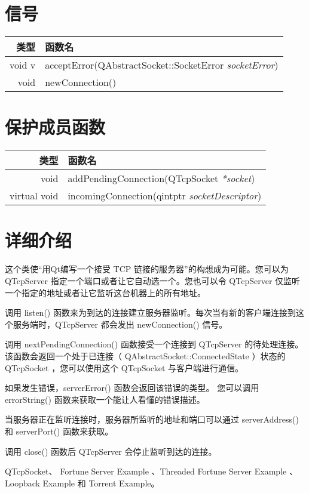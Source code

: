 \section{信号}

\begin{tabular}{|r|l|}
	\hline
	类型	 & 函数名 \\
	\hline
void	v & acceptError(QAbstractSocket::SocketError \emph{socketError}) \\
\hline
void	 & newConnection() \\
	\hline 
\end{tabular}

\section{保护成员函数}

\begin{tabular}{|r|l|}
	\hline
	类型	 & 函数名 \\
	\hline
void	 &  addPendingConnection(QTcpSocket \emph{*socket}) \\ 
\hline
virtual void	 & incomingConnection(qintptr \emph{socketDescriptor}) \\ 
	\hline 
\end{tabular}

\section{详细介绍}

这个类使“用Qt编写一个接受 TCP 链接的服务器”的构想成为可能。您可以为 QTcpServer 指定一个端口或者让它自动选一个。您也可以令 QTcpServer 仅监听一个指定的地址或者让它监听这台机器上的所有地址。

调用 listen() 函数来为到达的连接建立服务器监听。每次当有新的客户端连接到这个服务端时，QTcpServer 都会发出 newConnection() 信号。

调用 nextPendingConnection() 函数接受一个连接到 QTcpServer 的待处理连接。 该函数会返回一个处于已连接（ QAbstractSocket::ConnectedState ）状态的 QTcpSocket ，您可以使用这个 QTcpSocket 与客户端进行通信。

如果发生错误，serverError() 函数会返回该错误的类型。 您可以调用 errorString() 函数来获取一个能让人看懂的错误描述。

当服务器正在监听连接时，服务器所监听的地址和端口可以通过 serverAddress() 和 serverPort() 函数来获取。

调用 close() 函数后 QTcpServer 会停止监听到达的连接。

\begin{seeAlso}
QTcpSocket、 Fortune Server Example 、Threaded Fortune Server Example 、Loopback Example 和 Torrent Example。
\end{seeAlso}


